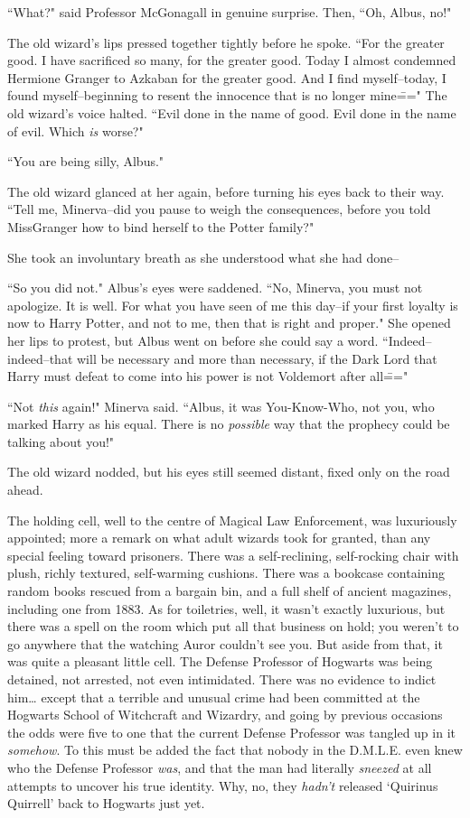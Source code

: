 ``What?" said Professor McGonagall in genuine surprise. Then, ``Oh, Albus, no!"

The old wizard's lips pressed together tightly before he spoke. ``For the greater good. I have sacrificed so many, for the greater good. Today I almost condemned Hermione Granger to Azkaban for the greater good. And I find myself\---today, I found myself\---beginning to resent the innocence that is no longer mine\===" The old wizard's voice halted. ``Evil done in the name of good. Evil done in the name of evil. Which \emph{is} worse?"

``You are being silly, Albus."

The old wizard glanced at her again, before turning his eyes back to their way. ``Tell me, Minerva\---did you pause to weigh the consequences, before you told Miss\?Granger how to bind herself to the Potter family?"

She took an involuntary breath as she understood what she had done\---

``So you did not." Albus's eyes were saddened. ``No, Minerva, you must not apologize. It is well. For what you have seen of me this day\---if your first loyalty is now to Harry Potter, and not to me, then that is right and proper." She opened her lips to protest, but Albus went on before she could say a word. ``Indeed\---indeed\---that will be necessary and more than necessary, if the Dark Lord that Harry must defeat to come into his power is not Voldemort after all\==="

``Not \emph{this} again!" Minerva said. ``Albus, it was You-Know-Who, not you, who marked Harry as his equal. There is no \emph{possible} way that the prophecy could be talking about you!"

The old wizard nodded, but his eyes still seemed distant, fixed only on the road ahead.

\later

The holding cell, well to the centre of Magical Law Enforcement, was luxuriously appointed; more a remark on what adult wizards took for granted, than any special feeling toward prisoners. There was a self-reclining, self-rocking chair with plush, richly textured, self-warming cushions. There was a bookcase containing random books rescued from a bargain bin, and a full shelf of ancient magazines, including one from 1883. As for toiletries, well, it wasn't exactly luxurious, but there was a spell on the room which put all that business on hold; you weren't to go anywhere that the watching Auror couldn't see you. But aside from that, it was quite a pleasant little cell. The Defense Professor of Hogwarts was being detained, not arrested, not even intimidated. There was no evidence to indict him{\ldots} except that a terrible and unusual crime had been committed at the Hogwarts School of Witchcraft and Wizardry, and going by previous occasions the odds were five to one that the current Defense Professor was tangled up in it \emph{somehow}. To this must be added the fact that nobody in the D.M.L.E. even knew who the Defense Professor \emph{was}, and that the man had literally \emph{sneezed} at all attempts to uncover his true identity. Why, no, they \emph{hadn't} released `Quirinus Quirrell' back to Hogwarts just yet.

